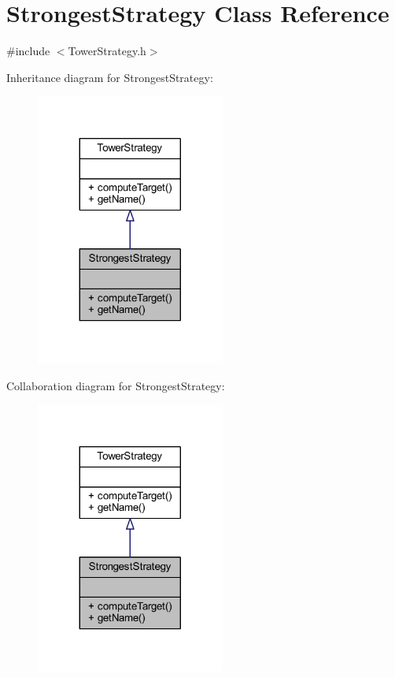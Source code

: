 \hypertarget{class_strongest_strategy}{\section{Strongest\+Strategy Class Reference}
\label{class_strongest_strategy}
}


{\ttfamily \#include $<$Tower\+Strategy.\+h$>$}



Inheritance diagram for Strongest\+Strategy\+:
\nopagebreak
\begin{figure}[H]
\begin{center}
\leavevmode
\includegraphics[width=176pt]{class_strongest_strategy__inherit__graph}
\end{center}
\end{figure}


Collaboration diagram for Strongest\+Strategy\+:
\nopagebreak
\begin{figure}[H]
\begin{center}
\leavevmode
\includegraphics[width=176pt]{class_strongest_strategy__coll__graph}
\end{center}
\end{figure}
